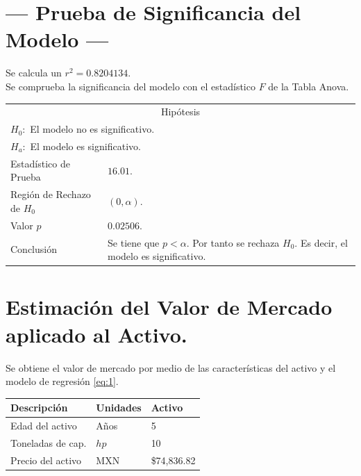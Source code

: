 \documentclass{article}
\begin{document}
\section{\centering --- Prueba de Significancia del Modelo ---} %
Se calcula un \(r ^ 2 = 0.8204134\). \\ 
Se comprueba la significancia del modelo con el estadístico \(F\) de la Tabla Anova.
\begin{center}
  \begin{tabular}{|l|p{6cm}|}
    \cline{1-2}
    \multicolumn{2}{|c|}{Hipótesis}\\ \cline{1-2}
    \multicolumn{2}{|l|}{\(H_0:\) El modelo no es significativo.} \\ 
    \multicolumn{2}{|l|}{\(H_a:\) El modelo es significativo.} \\ \cline{1-2}
    Estadístico de Prueba & \(16.01\).\\ \cline{1-2} 
		Región de Rechazo de \(H_0\) & \((0, \alpha )\).\\ \cline{1-2} 
    Valor \(p\) & \(0.02506\).\\ \cline{1-2} 
    Conclusión & Se tiene que \(p<\alpha\). \newline 
		Por tanto se rechaza \(H_0\). \newline 
		Es decir, el modelo es significativo.\\ \cline{1-2} 
  \end{tabular}
\end{center} 

\section{\centering Estimación del Valor de Mercado aplicado al Activo.} %
Se obtiene el valor de mercado por medio de las características del activo y el modelo de regresión \eqref{eq:1}.
\begin{center}
  \begin{tabular}{|l|l|l|}
    \hline 
		Descripción   & Unidades  & Activo \\ \hline 
    Edad del activo    & Años      & 5      \\ \hline 
		Toneladas de cap.  & \(hp\) & 10   \\ \hline 
		Precio del activo   & MXN       & \$74,836.82   \\ \hline 
  \end{tabular}
\end{center} 
\end{document}
